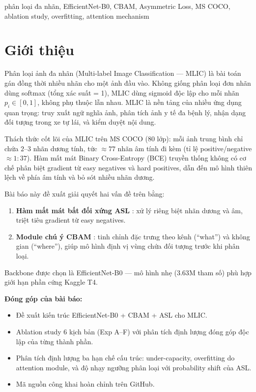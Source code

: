 \documentclass[conference]{IEEEtran}
\begin{document}
\begin{IEEEkeywords}
phân loại đa nhãn, EfficientNet-B0, CBAM, Asymmetric Loss, MS COCO,
ablation study, overfitting, attention mechanism
\end{IEEEkeywords}

\section{Giới thiệu}
\label{sec:intro}

Phân loại ảnh đa nhãn (Multi-label Image Classification --- MLIC) là bài toán
gán đồng thời nhiều nhãn cho một ảnh đầu vào. Không giống phân loại đơn nhãn
dùng softmax (tổng xác suất = 1), MLIC dùng sigmoid độc lập cho mỗi nhãn
$p_i \in [0,1]$, không phụ thuộc lẫn nhau.
MLIC là nền tảng của nhiều ứng dụng quan trọng:
truy xuất ngữ nghĩa ảnh, phân tích ảnh y tế đa bệnh lý,
nhận dạng đối tượng trong xe tự lái, và kiểm duyệt nội dung.

Thách thức cốt lõi của MLIC trên MS COCO (80 lớp):
mỗi ảnh trung bình chỉ chứa $2$--$3$ nhãn dương tính,
tức $\approx 77$ nhãn âm tính đi kèm (tỉ lệ positive/negative $\approx 1{:}37$).
Hàm mất mát Binary Cross-Entropy (BCE) truyền thống không có cơ chế phân biệt
gradient từ easy negatives và hard positives, dẫn đến mô hình thiên lệch
về phía âm tính và bỏ sót nhiều nhãn dương.

Bài báo này đề xuất giải quyết hai vấn đề trên bằng:
\begin{enumerate}[leftmargin=1.8em]
  \item \textbf{Hàm mất mát bất đối xứng ASL} \cite{ridnik2021asl}:
        xử lý riêng biệt nhãn dương và âm, triệt tiêu gradient từ easy negatives.
  \item \textbf{Module chú ý CBAM} \cite{woo2018cbam}:
        tinh chỉnh đặc trưng theo kênh (``what'') và không gian (``where''),
        giúp mô hình định vị vùng chứa đối tượng trước khi phân loại.
\end{enumerate}
Backbone được chọn là EfficientNet-B0 \cite{tan2019efficientnet} ---
mô hình nhẹ ($3.63\text{M}$ tham số) phù hợp giới hạn phần cứng Kaggle T4.

\textbf{Đóng góp của bài báo:}
\begin{itemize}[leftmargin=1.8em]
  \item Đề xuất kiến trúc EfficientNet-B0 + CBAM + ASL cho MLIC.
  \item Ablation study 6 kịch bản (Exp A--F) với phân tích định lượng
        đóng góp độc lập của từng thành phần.
  \item Phân tích định lượng ba hạn chế cấu trúc:
        under-capacity, overfitting do attention module,
        và độ nhạy ngưỡng phân loại với probability shift của ASL.
  \item Mã nguồn công khai hoàn chỉnh trên GitHub.
\end{itemize}
\end{document}
